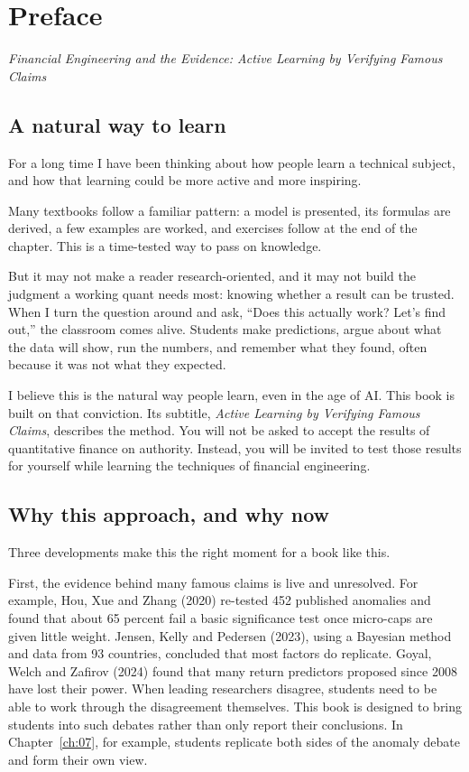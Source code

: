\chapter*{Preface}

\emph{Financial Engineering and the Evidence: Active Learning by Verifying Famous Claims}

\section*{A natural way to learn}

For a long time I have been thinking about how people learn a technical subject, and how that learning could be more active and more inspiring.

Many textbooks follow a familiar pattern: a model is presented, its formulas are derived, a few examples are worked, and exercises follow at the end of the chapter. This is a time-tested way to pass on knowledge.

But it may not make a reader research-oriented, and it may not build the judgment a working quant needs most: knowing whether a result can be trusted. When I turn the question around and ask, ``Does this actually work? Let's find out,'' the classroom comes alive. Students make predictions, argue about what the data will show, run the numbers, and remember what they found, often because it was not what they expected.

I believe this is the natural way people learn, even in the age of AI. This book is built on that conviction. Its subtitle, \emph{Active Learning by Verifying Famous Claims}, describes the method. You will not be asked to accept the results of quantitative finance on authority. Instead, you will be invited to test those results for yourself while learning the techniques of financial engineering.

\section*{Why this approach, and why now}

Three developments make this the right moment for a book like this.

First, the evidence behind many famous claims is live and unresolved. For example, Hou, Xue and Zhang (2020) re-tested 452 published anomalies and found that about 65 percent fail a basic significance test once micro-caps are given little weight. Jensen, Kelly and Pedersen (2023), using a Bayesian method and data from 93 countries, concluded that most factors do replicate. Goyal, Welch and Zafirov (2024) found that many return predictors proposed since 2008 have lost their power. When leading researchers disagree, students need to be able to work through the disagreement themselves. This book is designed to bring students into such debates rather than only report their conclusions. In Chapter~\ref{ch:07}, for example, students replicate both sides of the anomaly debate and form their own view.

